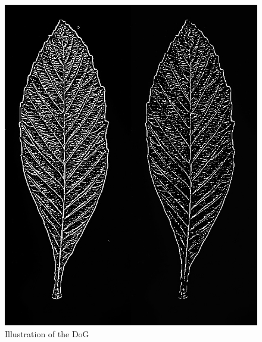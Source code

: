 \documentclass[12pt]{article}
\begin{document}
\begin{itemize}
\begin{figure}[h]
    \includegraphics[scale=0.3]{DoG.jpg}
    \caption{Illustration of the DoG}\label{figure:Illustration of the DoG}
\end{figure}


\end{itemize}
\end{document}
